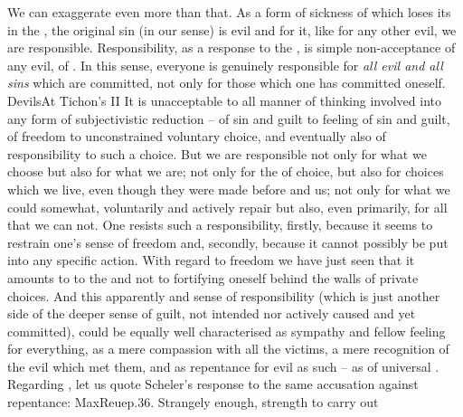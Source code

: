 We can exaggerate even more than that.  As a form of sickness of 
which loses its  in the , the original sin
(in our sense) is evil and for it, like for any other evil, we are responsible.
Responsibility, as a response to the , is simple non-acceptance of
any evil, of . In this sense, everyone is genuinely responsible
for {\em all evil and all sins} which are committed, not only for those which
one has committed oneself. \citet{Every man who sins, sins against all people and
  every man is to some degree guilty of another's sin.}{Devils}{At Tichon's
  II}
It is unacceptable 
to all manner of thinking involved into any form of
subjectivistic reduction -- of sin and guilt to feeling of sin and guilt, of
freedom to unconstrained voluntary choice, and eventually also of
responsibility to such a choice.
But we are responsible not only for what we choose but also for what we are; not
only for the  of choice, but also for choices which we live,
even though they were made
before and  us; not only for what we could somewhat, voluntarily and
actively repair but also, even primarily, for all that we can not.  One resists
such a responsibility, firstly, because it seems to restrain one's sense of
freedom and, secondly, because it cannot possibly be put into any specific
action. With regard to freedom we have just seen that it amounts to
 to the  and not to fortifying oneself behind the
walls of private choices. And this apparently  and
 sense of responsibility  (which is just
another side of the deeper sense of guilt, not intended nor actively caused and
yet committed), could be equally well characterised as sympathy and fellow
feeling for everything, as a mere compassion with all the victims, a mere
recognition of the evil which met them, and as repentance for evil as such -- 
as  of universal . Regarding
  , let us quote Scheler's response to the same accusation
against repentance: \citet{The jovial gentlemen say: Do not repent, but design
  good projects and do better in the future! But the jovial gentlemen do not say
 whence the strength for designing good projects and even more for their execution
 should be fetched, if no prior  liberation and self-empowerment of the person, 
 through repentance, against the determining power of the past takes
 place.}{MaxReue}{p.36. } Strangely enough, strength to carry out
